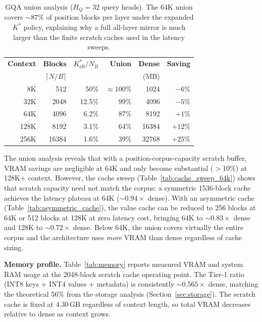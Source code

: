\documentclass[11pt,a4paper]{article}
\theoremstyle{definition}
\theoremstyle{remark}
\begin{document}
\begin{table}[H]
\centering
\caption{GQA union analysis ($H_Q{=}32$ query heads).  The 64K union covers ${\sim}87\%$ of position blocks per layer under the expanded $K^*$ policy, explaining why a full all-layer mirror is much larger than the finite scratch caches used in the latency sweeps.}
\label{tab:union}
\small
\begin{tabular}{rrrrrr}
\toprule
\textbf{Context} & \textbf{Blocks} & \textbf{$K^*_{\mathrm{eff}}/N_B$} & \textbf{Union} & \textbf{Dense} & \textbf{Saving} \\
 & $\lceil N/B \rceil$ & & & (MB) & \\
\midrule
8K   & 512   & 50\%    & ${\approx}100\%$  & 1024  & $-6\%$ \\
32K  & 2048  & 12.5\%  & 99\%    & 4096  & $-5\%$ \\
\rowcolor[gray]{0.92}
64K  & 4096  & 6.2\%   & 87\%    & 8192  & $+1\%$ \\
128K & 8192  & 3.1\%   & 64\%    & 16384 & $+12\%$ \\
256K & 16384 & 1.6\%   & 39\%    & 32768 & $+25\%$ \\
\bottomrule
\end{tabular}
\end{table}

The union analysis reveals that with a position-corpus-capacity scratch buffer, VRAM savings are negligible at 64K and only become substantial ($>$10\%) at 128K+ context.  However, the cache sweep (Table~\ref{tab:cache_sweep_64k}) shows that scratch capacity need not match the corpus: a symmetric 1536-block cache achieves the latency plateau at 64K (${\sim}0.94\times$ dense).  With an asymmetric cache (Table~\ref{tab:asymmetric_cache}), the value cache can be reduced to 256 blocks at 64K or 512 blocks at 128K at zero latency cost, bringing 64K to ${\sim}0.83\times$ dense and 128K to ${\sim}0.72\times$ dense.  Below 64K, the union covers virtually the entire corpus and the architecture uses \emph{more} VRAM than dense regardless of cache sizing.

\textbf{Memory profile.}  Table~\ref{tab:memory} reports measured VRAM and system RAM usage at the 2048-block scratch cache operating point.  The Tier-1 ratio (INT8 keys + INT4 values + metadata) is consistently ${\sim}0.565\times$ dense, matching the theoretical 56\% from the storage analysis (Section~\ref{sec:storage}).  The scratch cache is fixed at 4.30\,GB regardless of context length, so total VRAM decreases relative to dense as context grows.
\end{document}
